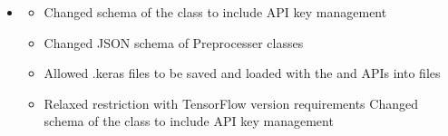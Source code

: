 \documentclass[letterpaper,10pt,english]{sphinxmanual}
\begin{document}
\begin{itemize}
\begin{description}
\begin{itemize}
\end{itemize}

\end{description}

\item {} \begin{description}
\begin{itemize}
\item {} 
\sphinxAtStartPar
Changed schema of the  class to include API key management

\item {} 
\sphinxAtStartPar
Changed JSON schema of Preprocesser classes

\item {} 
\sphinxAtStartPar
Allowed .keras files to be saved and loaded with the  and  APIs into  files

\item {} 
\sphinxAtStartPar
Relaxed restriction with TensorFlow version requirements\sphinxhyphen{} Changed schema of the  class to include API key management

\end{itemize}

\end{description}

\end{itemize}
\end{document}
